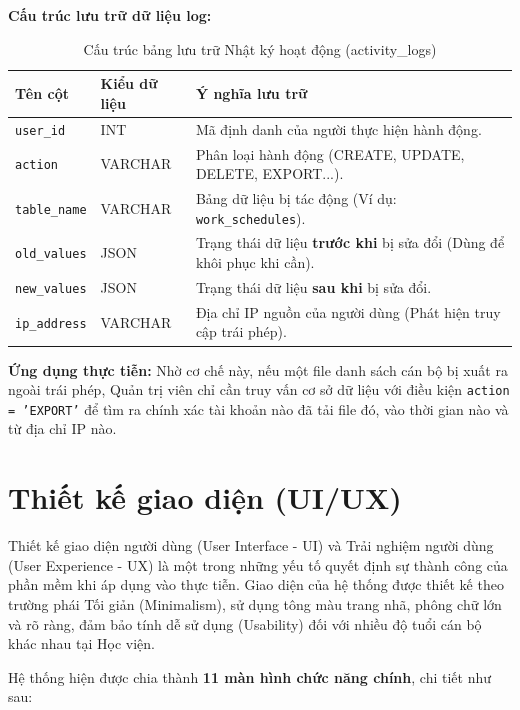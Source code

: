 \documentclass[18pt,a4paper]{report}
\begin{document}
\textbf{Cấu trúc lưu trữ dữ liệu log:}
\begin{table}[H]
\centering
\caption{Cấu trúc bảng lưu trữ Nhật ký hoạt động (activity\_logs)}
\begin{tabularx}{\textwidth}{|l|l|X|}
\hline
\textbf{Tên cột} & \textbf{Kiểu dữ liệu} & \textbf{Ý nghĩa lưu trữ} \\ \hline
\texttt{user\_id} & INT & Mã định danh của người thực hiện hành động. \\ \hline
\texttt{action} & VARCHAR & Phân loại hành động (CREATE, UPDATE, DELETE, EXPORT...). \\ \hline
\texttt{table\_name} & VARCHAR & Bảng dữ liệu bị tác động (Ví dụ: \texttt{work\_schedules}). \\ \hline
\texttt{old\_values} & JSON & Trạng thái dữ liệu \textbf{trước khi} bị sửa đổi (Dùng để khôi phục khi cần). \\ \hline
\texttt{new\_values} & JSON & Trạng thái dữ liệu \textbf{sau khi} bị sửa đổi. \\ \hline
\texttt{ip\_address} & VARCHAR & Địa chỉ IP nguồn của người dùng (Phát hiện truy cập trái phép). \\ \hline
\end{tabularx}
\end{table}

\textbf{Ứng dụng thực tiễn:} 
Nhờ cơ chế này, nếu một file danh sách cán bộ bị xuất ra ngoài trái phép, Quản trị viên chỉ cần truy vấn cơ sở dữ liệu với điều kiện \texttt{action = 'EXPORT'} để tìm ra chính xác tài khoản nào đã tải file đó, vào thời gian nào và từ địa chỉ IP nào.
\chapter{Thiết kế giao diện (UI/UX)}

Thiết kế giao diện người dùng (User Interface - UI) và Trải nghiệm người dùng (User Experience - UX) là một trong những yếu tố quyết định sự thành công của phần mềm khi áp dụng vào thực tiễn. Giao diện của hệ thống được thiết kế theo trường phái Tối giản (Minimalism), sử dụng tông màu trang nhã, phông chữ lớn và rõ ràng, đảm bảo tính dễ sử dụng (Usability) đối với nhiều độ tuổi cán bộ khác nhau tại Học viện. 

Hệ thống hiện được chia thành \textbf{11 màn hình chức năng chính}, chi tiết như sau:
\end{document}

